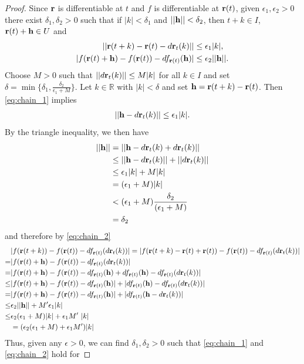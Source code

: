 \documentclass[12pt,letterpaper,reqno]{article}
\numberwithin{equation}{section}
\newcommand{\bh}{{\bf h}}
\newcommand{\R}{\ensuremath{\mathbb R}}
\newcommand{\bbr}{{\bf r}}
\begin{document}
{\begin{proof}
	Since $\bbr$ is differentiable at $t$ and $f$ is differentiable at $\bbr(t)$, given $\epsilon_1,\epsilon_2>0$ there exist $\delta_1,\delta_2>0$ such that if $|k|<\delta_1$ and $||\bh||<\delta_2$, then $t+k \in I$, $\bbr(t)+\bh \in U$ and 
	\begin{align}\label{eq:chain_1}
		||\bbr(t+k)-\bbr(t)-d\bbr_t(k)|| &\leq \epsilon_1|k|, \\ \label{eq:chain_2}
		|f(\bbr(t)+\bh)-f(\bbr(t))-df_{\bbr(t)}(\bh)|&\leq \epsilon_2||\bh||.
	\end{align}
Choose $M>0$ such that $||d\bbr_t(k)||\leq M|k|$ for all $k \in I$ and set $\delta=\min\{\delta_1,\frac{\delta_2}{\epsilon_1+M}\}$. Let $k \in \R$ with $|k|<\delta$ and set $\bh=\bbr(t+k)-\bbr(t)$. Then \eqref{eq:chain_1} implies
\begin{align*}
	||\bh-d\bbr_t(k)|| \leq \epsilon_1|k|.
\end{align*}
By the triangle inequality, we then have
\begin{align*}
	||\bh||&=||\bh-d\bbr_t(k)+d\bbr_t(k)|| \\
	&\leq ||\bh-d\bbr_t(k)||+||d\bbr_t(k)|| \\
	&\leq \epsilon_1 |k|+M |k| \\
	&=(\epsilon_1+M)|k| \\
	& < (\epsilon_1+M) \frac{\delta_2}{(\epsilon_1+M) } \\
	&=\delta_2
\end{align*}
and therefore by \eqref{eq:chain_2}
\begin{align*}
	&|f(\bbr(t+k))-f(\bbr(t))-df_{\bbr(t)}(d\bbr_t(k))|=|f(\bbr(t+k)-\bbr(t)+\bbr(t))-f(\bbr(t))-df_{\bbr(t)}(d\bbr_t(k))| \\
	=&|f(\bbr(t)+\bh)-f(\bbr(t))-df_{\bbr(t)}(d\bbr_t(k))| \\
	=&|f(\bbr(t)+\bh)-f(\bbr(t))-df_{\bbr(t)}(\bh)+df_{\bbr(t)}(\bh)-df_{\bbr(t)}(d\bbr_t(k))| \\
	\leq & |f(\bbr(t)+\bh)-f(\bbr(t))-df_{\bbr(t)}(\bh)|+|df_{\bbr(t)}(\bh)-df_{\bbr(t)}(d\bbr_t(k))| \\
	=& |f(\bbr(t)+\bh)-f(\bbr(t))-df_{\bbr(t)}(\bh)|+|df_{\bbr(t)}(\bh-d\bbr_t(k))| \\
	\leq & \epsilon_2||\bh||+M'\epsilon_1|k| \\
	\leq &\epsilon_2(\epsilon_1+M)|k|+\epsilon_1M' \ |k| \\
	&=(\epsilon_2(\epsilon_1+M)+\epsilon_1M')|k|
\end{align*}
Thus, given any $\epsilon>0$, we can find $\delta_1,\delta_2>0$ such that \eqref{eq:chain_1} and \eqref{eq:chain_2} hold for 

\end{proof}}
\end{document}
